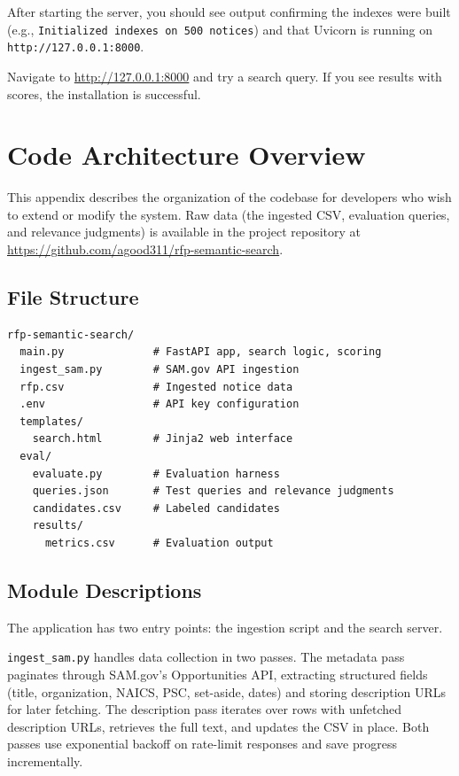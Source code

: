 \documentclass[10pt,twocolumn]{article}
\begin{document}
After starting the server, you should see output confirming the indexes were built (e.g., \texttt{Initialized indexes on 500 notices}) and that Uvicorn is running on \texttt{http://127.0.0.1:8000}.

Navigate to \url{http://127.0.0.1:8000} and try a search query. If you see results with scores, the installation is successful.

\section{Code Architecture Overview}

This appendix describes the organization of the codebase for developers who wish to extend or modify the system. Raw data (the ingested CSV, evaluation queries, and relevance judgments) is available in the project repository at \url{https://github.com/agood311/rfp-semantic-search}.

\subsection{File Structure}

\begin{lstlisting}
rfp-semantic-search/
  main.py              # FastAPI app, search logic, scoring
  ingest_sam.py        # SAM.gov API ingestion
  rfp.csv              # Ingested notice data
  .env                 # API key configuration
  templates/
    search.html        # Jinja2 web interface
  eval/
    evaluate.py        # Evaluation harness
    queries.json       # Test queries and relevance judgments
    candidates.csv     # Labeled candidates
    results/
      metrics.csv      # Evaluation output
\end{lstlisting}

\subsection{Module Descriptions}

The application has two entry points: the ingestion script and the search server.

\texttt{ingest\_sam.py} handles data collection in two passes. The metadata pass paginates through SAM.gov's Opportunities API, extracting structured fields (title, organization, NAICS, PSC, set-aside, dates) and storing description URLs for later fetching. The description pass iterates over rows with unfetched description URLs, retrieves the full text, and updates the CSV in place. Both passes use exponential backoff on rate-limit responses and save progress incrementally.
\end{document}
